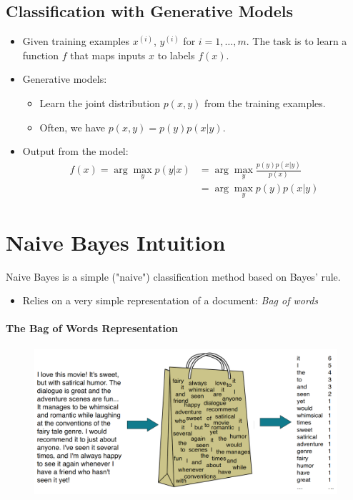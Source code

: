 \subsection{Classification with Generative Models}
  \begin{itemize}
    \item Given training examples $x^{(i)}$, $y^{(i)}$ for $i = 1, \ldots, m$. The task is to learn a function $f$ that maps inputs $x$ to labels $f(x)$.
    \item Generative models:
    \begin{itemize}
      \item Learn the joint distribution $p(x, y)$ from the training examples.
      \item Often, we have $p(x, y) = p(y)p(x|y)$.
    \end{itemize}
    \item Output from the model:
\[
\begin{aligned}
f(x) = \arg\max_y p(y|x) &= \arg\max_y \frac{p(y)p(x|y)}{p(x)} \\
&= \arg\max_y p(y)p(x|y)
\end{aligned}
\]
  \end{itemize}



\section{Naive Bayes Intuition}
    Naive Bayes is a simple ("naive") classification method based on Bayes' rule.
    \begin{itemize}
        \item Relies on a very simple representation of a document: \textit{Bag of words}
    \end{itemize}


\paragraph{The Bag of Words Representation}

\begin{figure}[h]
\includegraphics[scale = 0.22]{pics/bow.png}
\end{figure}


